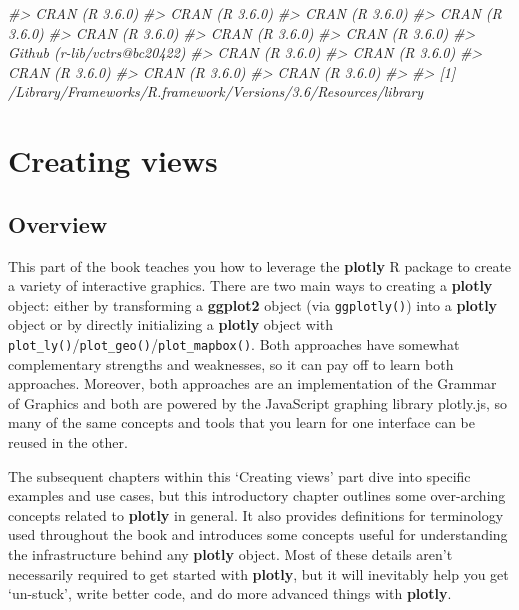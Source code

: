 \documentclass[
  12pt,
]{krantz}
\newenvironment{Shaded}{\begin{snugshade}}{\end{snugshade}}
\newcommand{\CommentTok}[1]{\textcolor[rgb]{0.56,0.35,0.01}{\textit{#1}}}
\begin{document}
\begin{Shaded}
\begin{Highlighting}[]
\CommentTok{#>  CRAN (R 3.6.0)                       }
\CommentTok{#>  CRAN (R 3.6.0)                       }
\CommentTok{#>  CRAN (R 3.6.0)                       }
\CommentTok{#>  CRAN (R 3.6.0)                       }
\CommentTok{#>  CRAN (R 3.6.0)                       }
\CommentTok{#>  CRAN (R 3.6.0)                       }
\CommentTok{#>  CRAN (R 3.6.0)                       }
\CommentTok{#>  Github (r-lib/vctrs@bc20422)         }
\CommentTok{#>  CRAN (R 3.6.0)                       }
\CommentTok{#>  CRAN (R 3.6.0)                       }
\CommentTok{#>  CRAN (R 3.6.0)                       }
\CommentTok{#>  CRAN (R 3.6.0)                       }
\CommentTok{#>  CRAN (R 3.6.0)                       }
\CommentTok{#> }
\CommentTok{#> [1] /Library/Frameworks/R.framework/Versions/3.6/Resources/library}
\end{Highlighting}
\end{Shaded}

\hypertarget{part-creating-views}{%
\part{Creating views}\label{part-creating-views}}

\hypertarget{overview}{%
\chapter{Overview}\label{overview}}

This part of the book teaches you how to leverage the \textbf{plotly} R package to create a variety of interactive graphics. There are two main ways to creating a \textbf{plotly} object: either by transforming a \textbf{ggplot2} object (via \texttt{ggplotly()}) into a \textbf{plotly} object or by directly initializing a \textbf{plotly} object with \texttt{plot\_ly()}/\texttt{plot\_geo()}/\texttt{plot\_mapbox()}. Both approaches have somewhat complementary strengths and weaknesses, so it can pay off to learn both approaches. Moreover, both approaches are an implementation of the Grammar of Graphics and both are powered by the JavaScript graphing library plotly.js, so many of the same concepts and tools that you learn for one interface can be reused in the other.

The subsequent chapters within this `Creating views' part dive into specific examples and use cases, but this introductory chapter outlines some over-arching concepts related to \textbf{plotly} in general. It also provides definitions for terminology used throughout the book and introduces some concepts useful for understanding the infrastructure behind any \textbf{plotly} object. Most of these details aren't necessarily required to get started with \textbf{plotly}, but it will inevitably help you get `un-stuck', write better code, and do more advanced things with \textbf{plotly}.
\end{document}

